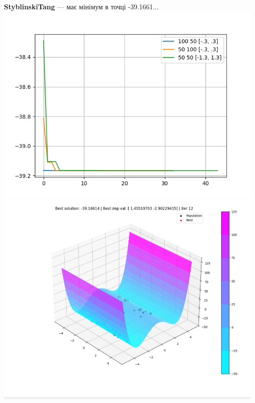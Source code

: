 \documentclass{article}
\begin{document}
        \newpage
        \textbf{StyblinskiTang} --- має мінімум в точці -39.1661...
            \newline
            \includegraphics[scale=0.7]{StyblinskiTang_dif.png}
            \newline
            \includegraphics[scale=0.7]{StyblinskiTang.jpg}
            \newline
\end{document}
